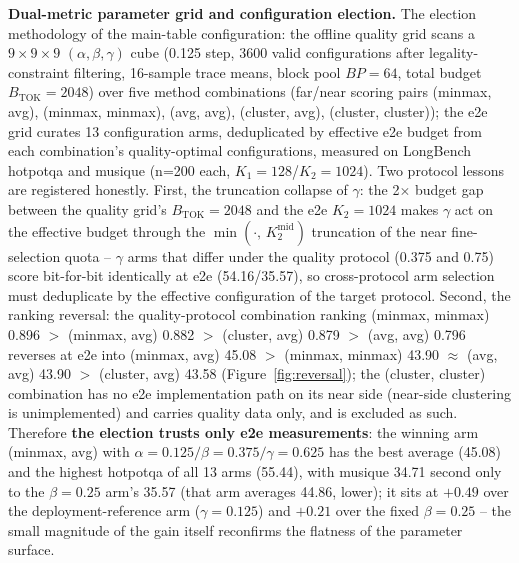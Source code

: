 \documentclass[11pt]{article}
\begin{document}
\textbf{Dual-metric parameter grid and configuration election.} The election methodology of the main-table configuration: the offline quality grid scans a $9\times9\times9$ $(\alpha,\beta,\gamma)$ cube (0.125 step, 3600 valid configurations after legality-constraint filtering, 16-sample trace means, block pool $BP{=}64$, total budget $B_{\mathrm{TOK}}{=}2048$) over five method combinations (far/near scoring pairs (minmax, avg), (minmax, minmax), (avg, avg), (cluster, avg), (cluster, cluster)); the e2e grid curates 13 configuration arms, deduplicated by effective e2e budget from each combination's quality-optimal configurations, measured on LongBench hotpotqa and musique (n=200 each, $K_1{=}128$/$K_2{=}1024$). Two protocol lessons are registered honestly. First, the truncation collapse of $\gamma$: the 2$\times$ budget gap between the quality grid's $B_{\mathrm{TOK}}{=}2048$ and the e2e $K_2{=}1024$ makes $\gamma$ act on the effective budget through the $\min(\cdot,\,K_2^{\mathrm{mid}})$ truncation of the near fine-selection quota -- $\gamma$ arms that differ under the quality protocol (0.375 and 0.75) score bit-for-bit identically at e2e (54.16/35.57), so cross-protocol arm selection must deduplicate by the effective configuration of the target protocol. Second, the ranking reversal: the quality-protocol combination ranking (minmax, minmax) 0.896 $>$ (minmax, avg) 0.882 $>$ (cluster, avg) 0.879 $>$ (avg, avg) 0.796 reverses at e2e into (minmax, avg) 45.08 $>$ (minmax, minmax) 43.90 $\approx$ (avg, avg) 43.90 $>$ (cluster, avg) 43.58 (Figure~\ref{fig:reversal}); the (cluster, cluster) combination has no e2e implementation path on its near side (near-side clustering is unimplemented) and carries quality data only, and is excluded as such. Therefore \textbf{the election trusts only e2e measurements}: the winning arm (minmax, avg) with $\alpha{=}0.125/\beta{=}0.375/\gamma{=}0.625$ has the best average (45.08) and the highest hotpotqa of all 13 arms (55.44), with musique 34.71 second only to the $\beta{=}0.25$ arm's 35.57 (that arm averages 44.86, lower); it sits at $+0.49$ over the deployment-reference arm ($\gamma{=}0.125$) and $+0.21$ over the fixed $\beta{=}0.25$ -- the small magnitude of the gain itself reconfirms the flatness of the parameter surface.
\end{document}
